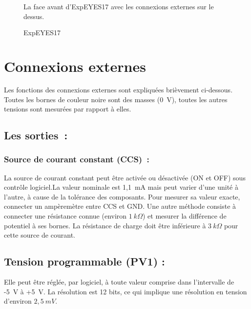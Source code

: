 \documentclass[a4paper,12pt,french]{sphinxmanual}
\let\sphinxpxdimen\pdfpxdimen\else\newdimen\sphinxpxdimen
\begin{document}
\begin{figure}[htbp]
\centering
\capstart

\noindent\sphinxincludegraphics[width=500\sphinxpxdimen]{{eyes17-panel}.pdf}
\caption{ExpEYES17}\label{\detokenize{1.2:id1}}\label{\detokenize{1.2:fig-e17}}
\begin{sphinxlegend}
La face avant d’ExpEYES17 avec les connexions externes sur le dessus.
\end{sphinxlegend}
\end{figure}


\section{Connexions externes}
\label{\detokenize{1.2:connexions-externes}}
Les fonctions des connexions externes sont expliquées brièvement ci-dessous.
Toutes les bornes de couleur noire sont des masses (0 V), toutes
les autres tensions sont mesurées par rapport à elles.


\subsection{Les sorties :}
\label{\detokenize{1.2:les-sorties}}

\subsubsection{Source de courant constant (CCS) :}
\label{\detokenize{1.2:source-de-courant-constant-ccs}}
La source de courant constant peut être activée ou désactivée (ON
et OFF) sous contrôle logiciel.La valeur nominale est 1,1 mA mais
peut varier d’une unité à l’autre, à cause de la tolérance des composants.
Pour mesurer sa valeur exacte, connecter un ampèremètre entre CCS
et GND. Une autre méthode consiste à connecter une résistance connue
(environ \(1~k\Omega\)) et mesurer la différence de potentiel
à ses bornes. La résistance de charge doit être inférieure à \(3~k\Omega\)
pour cette source de courant.


\subsection{Tension programmable (PV1) :}
\label{\detokenize{1.2:tension-programmable-pv1}}
Elle peut être réglée, par logiciel, à toute valeur comprise dans
l’intervalle de -5 V à +5 V. La résolution est 12 bits, ce qui implique
une résolution en tension d’environ \(2,5~mV\).
\end{document}
